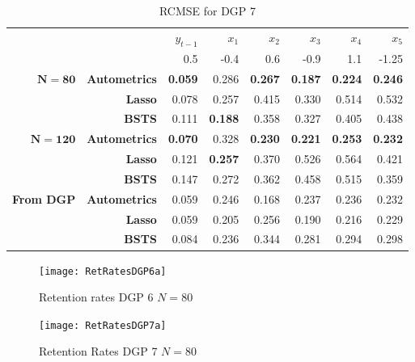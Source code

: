 \begin{table}[htbp]
  \centering

    \begin{tabular}{r|r|rrrrrr}

          &       & $y_{t-1}$ & $x_{1}$ & $x_{2}$ & $x_{3}$ & $x_{4}$ & $x_{5}$ \\

     &     & 0.5 & -0.4&0.6 &-0.9&1.1  &-1.25  \\
     \hline
    $\bm{N=80}$ & \textbf{Autometrics} & \textbf{0.059} & 0.286 & \textbf{0.267} & \textbf{0.187} & \textbf{0.224} & \textbf{0.246} \\
    \textbf{} & \textbf{Lasso} & 0.078 & 0.257 & 0.415 & 0.330 & 0.514 & 0.532 \\
    \textbf{} & \textbf{BSTS} & 0.111 & \textbf{0.188} & 0.358 & 0.327 & 0.405 & 0.438 \\
    \hline
     $\bm{N=120}$ & \textbf{Autometrics} & \textbf{0.070} & 0.328 & \textbf{0.230} & \textbf{0.221} & \textbf{0.253} &\textbf{ 0.232} \\
    \textbf{} & \textbf{Lasso} & 0.121 & \textbf{0.257} & 0.370 & 0.526 & 0.564 & 0.421 \\
    \textbf{} & \textbf{BSTS} & 0.147 & 0.272 & 0.362 & 0.458 & 0.515 & 0.359 \\
    \hline
    \textbf{From DGP} & \textbf{Autometrics} & 0.059 & 0.246 & 0.168 & 0.237 & 0.236 & 0.232 \\
          & \textbf{Lasso} & 0.059 & 0.205 & 0.256 & 0.190 & 0.216 & 0.229 \\
          & \textbf{BSTS} & 0.084 & 0.236 & 0.344 & 0.281 & 0.294 & 0.298 \\

    \end{tabular}%
      \caption{RCMSE for DGP 7}
  \label{DGP7CMSE}%
\end{table}%













\begin{figure}[h]

\begin{minipage}{.5\textwidth}
\centering
\texttt{[image: RetRatesDGP6a]}
\caption{Retention rates DGP 6 \newline $N=80$}
\label{fig:RetRatesDGP6a}
\end{minipage}%
\begin{minipage}{.5\textwidth}
\centering
\texttt{[image: RetRatesDGP7a]}
\caption{Retention Rates DGP 7 \newline $N=80$}
\label{fig:RetRatesDGP7a}

\end{minipage}

\end{figure}

